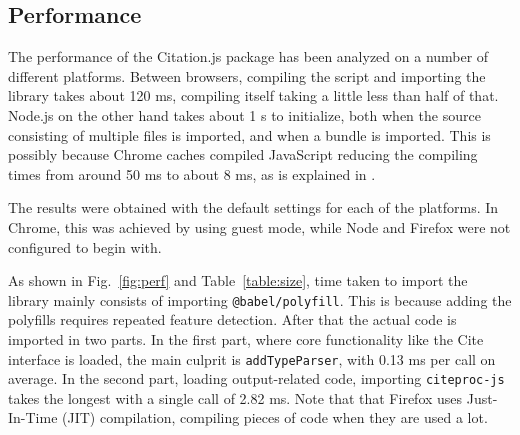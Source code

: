\documentclass[fleqn,10pt,lineno]{wlpeerj} %
\begin{document}
\subsection*{Performance}

The performance of the Citation.js package has been analyzed on a number of different platforms. Between browsers, compiling the script and importing the library takes about 120 ms, compiling itself taking a little less than half of that. Node.js on the other hand takes about 1 s to initialize, both when the source consisting of multiple files is imported, and when a bundle is imported. This is possibly because Chrome caches compiled JavaScript reducing the compiling times from around 50 ms to about 8 ms, as is explained in \cite{alle_improved_2018}.

The results were obtained with the default settings for each of the platforms. In Chrome, this was achieved by using guest mode, while Node and Firefox were not configured to begin with.

As shown in Fig.~\ref{fig:perf} and Table~\ref{table:size}, time taken to import the library mainly consists of importing \texttt{@babel/polyfill}. This is because adding the polyfills requires repeated feature detection. After that the actual code is imported in two parts. In the first part, where core functionality like the Cite interface is loaded, the main culprit is \texttt{addTypeParser}, with 0.13 ms per call on average. In the second part, loading output-related code, importing \texttt{citeproc-js} takes the longest with a single call of 2.82 ms.
Note that that Firefox uses Just-In-Time (JIT) compilation, compiling pieces of code when they are used a lot.
\end{document}
